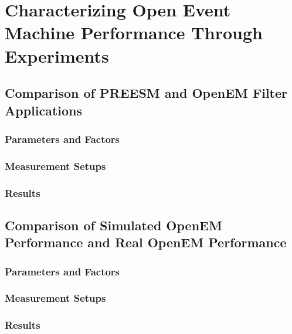 \chapter{Characterizing Open Event Machine Performance Through Experiments}
\label{chapter:experiments}
\section{Comparison of PREESM and OpenEM Filter Applications}
\subsection{Parameters and Factors}
\subsection{Measurement Setups}
\subsection{Results}
\section{Comparison of Simulated OpenEM Performance and Real OpenEM Performance}
\subsection{Parameters and Factors}
\subsection{Measurement Setups}
\subsection{Results}
 
